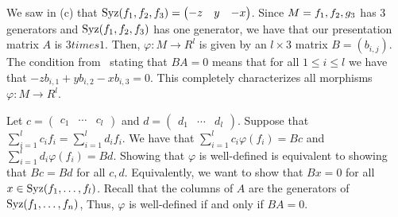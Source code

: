 \documentclass[letterpaper, 11pt, oneside]{book}
\begin{document}
\begin{sol}\label{ex:UAG_5.1.17}
  We saw in (c) that  $\Syz(f_{1}, f_{2}, f_{3}) = \gen{\begin{pmatrix} -z & y & -x \end{pmatrix}}$.
  Since $M = \gen{f_{1}, f_{2}, g_{3}}$ has 3 generators and $\operatorname{Syz}(f_{1}, f_{2}, f_{3})$ has one generator, we have that our presentation matrix $A$ is $3 times 1$.
  Then, $\varphi\colon M \to R^{l}$ is given by an $l \times 3$ matrix $B = (b_{i, j})$.
  The condition from~\cite[\S 5.1, Proposition 1.11]{book:UAG} stating that $BA = 0$ means that for all $1 \leq i \leq l$ we have that $-z b_{i, 1} + y b_{i, 2} - x b_{i, 3} = 0$.
  This completely characterizes all morphisms $\varphi\colon M \to R^{l}$.
\end{sol}

\clearpage

\begin{sol}\label{ex:UAG_5.1.18}
  Let $c = \begin{pmatrix} c_{1} & \cdots & c_{l} \end{pmatrix}$ and $d = \begin{pmatrix} d_{1} & \cdots & d_{l} \end{pmatrix}$.
  Suppose that $\sum_{i = 1}^{l} c_{i}f_{i} = \sum_{i = 1}^{l} d_{i}f_{i}$.
  We have that $\sum_{i = 1}^{l} c_{i}\varphi(f_{i}) = Bc$ and $\sum_{i = 1}^{l} d_{i}\varphi(f_{i}) = Bd$.
  Showing that $\varphi$ is well-defined is equivalent to showing that $Bc = Bd$ for all $c, d$.
  Equivalently, we want to show that $Bx = 0$ for all $x \in \operatorname{Syz}(f_{1}, \ldots, f_{l})$.
  Recall that the columns of $A$ are the generators of $\operatorname{Syz}(f_{1}, \ldots, f_{n})$,
  Thus, $\varphi$ is well-defined if and only if $BA = 0$.
\end{sol}
\end{document}
